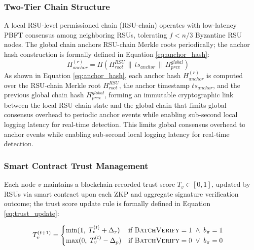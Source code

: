\documentclass[12pt, a4paper]{report}
\begin{document}
{\subsubsection{Two-Tier Chain Structure}
A local RSU-level permissioned chain (RSU-chain) operates with
low-latency PBFT consensus among neighboring RSUs, tolerating
$f < n/3$ Byzantine RSU nodes. The global chain anchors RSU-chain
Merkle roots periodically;
the anchor hash construction is formally defined in
Equation \eqref{eq:anchor_hash}:
\begin{equation}
H_{anchor}^{(r)} = H\!\left(H_{root}^{RSU} \,\|\,
ts_{anchor} \,\|\, H_{prev}^{global}\right)
\label{eq:anchor_hash}
\end{equation}
As shown in Equation \eqref{eq:anchor_hash}{, each anchor hash
$H_{anchor}^{(r)}$ is computed over the RSU-chain Merkle root
$H_{root}^{RSU}$, the anchor timestamp $ts_{anchor}$, and the
previous global chain hash $H_{prev}^{global}$, forming an
immutable cryptographic link between the local RSU-chain state and
the global chain that limits global consensus overhead to periodic
anchor events while enabling sub-second local logging latency for
real-time detection.}
This limits global consensus overhead to anchor events while
enabling sub-second local logging latency for real-time detection.

\subsubsection{Smart Contract Trust Management}
Each node $v$ maintains a blockchain-recorded trust score
$T_v \in [0,1]$, updated by RSUs via smart contract upon each
ZKP and aggregate signature verification outcome;
the trust score update rule is formally defined in
Equation \eqref{eq:trust_update}:

\begin{equation}
T_v^{(t+1)} =
\begin{cases}
\min(1,\; T_v^{(t)} + \Delta_r) &
\text{if } \textsc{BatchVerify} = 1
\;\land\; b_{\pi} = 1 \\
\max(0,\; T_v^{(t)} - \Delta_p) &
\text{if } \textsc{BatchVerify} = 0
\;\lor\; b_{\pi} = 0
\end{cases}
\label{eq:trust_update}
\end{equation}

}
\end{document}

